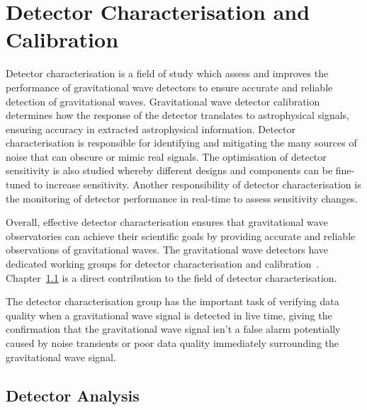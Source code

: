 \section{\label{3:sec:detchar_calib}Detector Characterisation and Calibration}

Detector characterisation is a field of study which assess and improves the performance of gravitational wave detectors to ensure accurate and reliable detection of gravitational waves. Gravitational wave detector calibration determines how the response of the detector translates to astrophysical signals, ensuring accuracy in extracted astrophysical information. Detector characterisation is responsible for identifying and mitigating the many sources of noise that can obscure or mimic real signals. The optimisation of detector sensitivity is also studied whereby different designs and components can be fine-tuned to increase sensitivity. Another responsibility of detector characterisation is the monitoring of detector performance in real-time to assess sensitivity changes.

Overall, effective detector characterisation ensures that gravitational wave observatories can achieve their scientific goals by providing accurate and reliable observations of gravitational waves. The gravitational wave detectors have dedicated working groups for detector characterisation and calibration~\cite{O2O3_DetChar:2021, VirgoDetChar:2023}. Chapter~\ref{} is a direct contribution to the field of detector characterisation.

The detector characterisation group has the important task of verifying data quality when a gravitational wave signal is detected in live time, giving the confirmation that the gravitational wave signal isn't a false alarm potentially caused by noise transients or poor data quality immediately surrounding the gravitational wave signal.

\subsection{\label{3:sec:detector-analysis}Detector Analysis}


